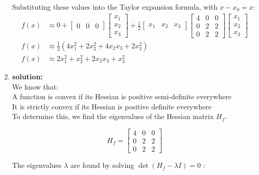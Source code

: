 \begin{enumerate}
    Substituting these values into the Taylor expansion formula, with \(x-x_0=x\):
    \begin{align*}
            f(x) &\approx 0+\left[\begin{array}{lll}
            0 & 0 & 0
            \end{array}\right]\left[\begin{array}{l}
            x_1 \\
            x_2 \\
            x_3
            \end{array}\right]+\frac{1}{2}\left[\begin{array}{lll}
            x_1 & x_2 & x_3
            \end{array}\right]\left[\begin{array}{lll}
            4 & 0 & 0 \\
            0 & 2 & 2 \\
            0 & 2 & 2
            \end{array}\right]\left[\begin{array}{l}
            x_1 \\
            x_2 \\
            x_3
            \end{array}\right] \\
            f(x) &\approx \frac{1}{2}\left(4 x_1^2+2 x_2^2+4 x_2 x_3+2 x_3^2\right) \\
            f(x) &\approx 2 x_1^2+x_2^2+2 x_2 x_3+x_3^2
    \end{align*}
    \item \textbf{solution:}\\
    We know that: \\
    A function is convex if its Hessian is positive semi-definite everywhere\\
    It is strictly convex if its Hessian is positive definite everywhere\\
    
    To determine this, we find the eigenvalues of the Hessian matrix $H_f$.

    $$
    H_f=\left[\begin{array}{lll}
    4 & 0 & 0 \\
    0 & 2 & 2 \\
    0 & 2 & 2
    \end{array}\right]
    $$


The eigenvalues $\lambda$ are found by solving $\operatorname{det}\left(H_f-\lambda I\right)=0$ :


\end{enumerate}
